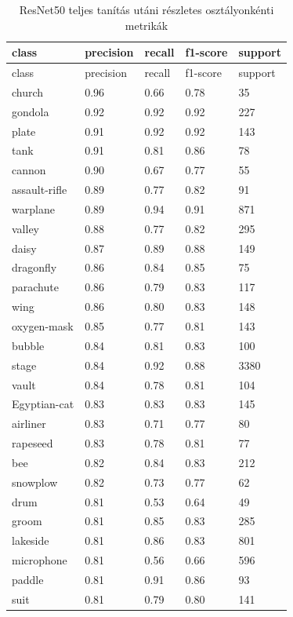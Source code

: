 \begin{center}
\begin{longtable}{lllll}
\caption{ResNet50 teljes tanítás utáni részletes osztályonkénti metrikák}\label{tab:phase2_resnet50_class_table}\\
\toprule
class & precision & recall & f1-score & support \\
\midrule
\endfirsthead
\toprule
class & precision & recall & f1-score & support \\
\midrule
\endhead
church & 0.96 & 0.66 & 0.78 & 35 \\
gondola & 0.92 & 0.92 & 0.92 & 227 \\
plate & 0.91 & 0.92 & 0.92 & 143 \\
tank & 0.91 & 0.81 & 0.86 & 78 \\
cannon & 0.90 & 0.67 & 0.77 & 55 \\
assault-rifle & 0.89 & 0.77 & 0.82 & 91 \\
warplane & 0.89 & 0.94 & 0.91 & 871 \\
valley & 0.88 & 0.77 & 0.82 & 295 \\
daisy & 0.87 & 0.89 & 0.88 & 149 \\
dragonfly & 0.86 & 0.84 & 0.85 & 75 \\
parachute & 0.86 & 0.79 & 0.83 & 117 \\
wing & 0.86 & 0.80 & 0.83 & 148 \\
oxygen-mask & 0.85 & 0.77 & 0.81 & 143 \\
bubble & 0.84 & 0.81 & 0.83 & 100 \\
stage & 0.84 & 0.92 & 0.88 & 3380 \\
vault & 0.84 & 0.78 & 0.81 & 104 \\
Egyptian-cat & 0.83 & 0.83 & 0.83 & 145 \\
airliner & 0.83 & 0.71 & 0.77 & 80 \\
rapeseed & 0.83 & 0.78 & 0.81 & 77 \\
bee & 0.82 & 0.84 & 0.83 & 212 \\
snowplow & 0.82 & 0.73 & 0.77 & 62 \\
drum & 0.81 & 0.53 & 0.64 & 49 \\
groom & 0.81 & 0.85 & 0.83 & 285 \\
lakeside & 0.81 & 0.86 & 0.83 & 801 \\
microphone & 0.81 & 0.56 & 0.66 & 596 \\
paddle & 0.81 & 0.91 & 0.86 & 93 \\
suit & 0.81 & 0.79 & 0.80 & 141 \\

\end{longtable}
\end{center}
